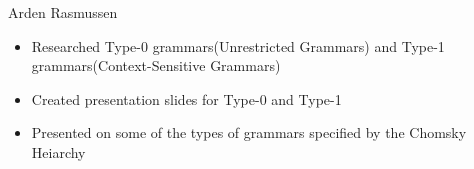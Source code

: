 \documentclass{article}
\begin{document}
{\huge Arden Rasmussen}
\begin{itemize}
  \item Researched Type-0 grammars(Unrestricted Grammars) and Type-1 grammars(Context-Sensitive Grammars)
  \item Created presentation slides for Type-0 and Type-1
  \item Presented on some of the types of grammars specified by the Chomsky Heiarchy
\end{itemize}
\end{document}
